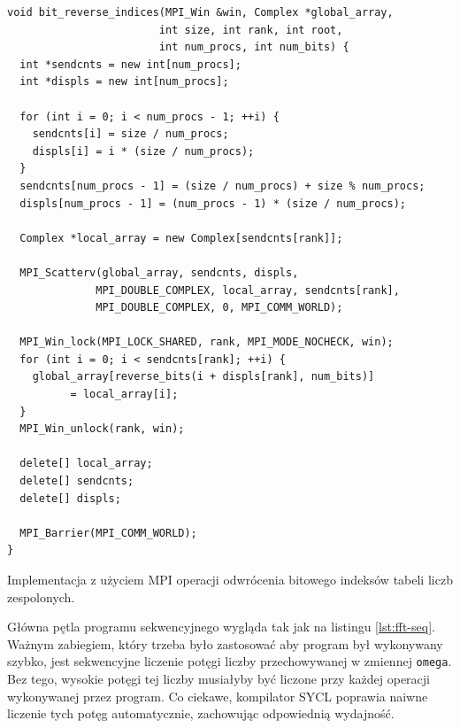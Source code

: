 \documentclass[a4paper,12pt]{book} %
\begin{document}
\begin{lstfloat}
\lstset{language=C++}
\begin{lstlisting}[frame=single]
void bit_reverse_indices(MPI_Win &win, Complex *global_array,
 						int size, int rank, int root,
 						int num_procs, int num_bits) {
  int *sendcnts = new int[num_procs];
  int *displs = new int[num_procs];

  for (int i = 0; i < num_procs - 1; ++i) {
    sendcnts[i] = size / num_procs;
    displs[i] = i * (size / num_procs);
  }
  sendcnts[num_procs - 1] = (size / num_procs) + size % num_procs;
  displs[num_procs - 1] = (num_procs - 1) * (size / num_procs);

  Complex *local_array = new Complex[sendcnts[rank]];

  MPI_Scatterv(global_array, sendcnts, displs,
  			  MPI_DOUBLE_COMPLEX, local_array, sendcnts[rank],
  			  MPI_DOUBLE_COMPLEX, 0, MPI_COMM_WORLD);

  MPI_Win_lock(MPI_LOCK_SHARED, rank, MPI_MODE_NOCHECK, win);
  for (int i = 0; i < sendcnts[rank]; ++i) {
    global_array[reverse_bits(i + displs[rank], num_bits)] 
    	  = local_array[i];
  }
  MPI_Win_unlock(rank, win);

  delete[] local_array;
  delete[] sendcnts;
  delete[] displs;

  MPI_Barrier(MPI_COMM_WORLD);
}
\end{lstlisting}
\caption{Implementacja z użyciem MPI operacji odwrócenia bitowego indeksów tabeli liczb zespolonych.}
\label{lst:bit-reverse-mpi}
\end{lstfloat}

Główna pętla programu sekwencyjnego wygląda tak jak na listingu \ref{lst:fft-seq}. Ważnym zabiegiem, który trzeba było zastosować aby program był wykonywany szybko, jest sekwencyjne liczenie potęgi liczby przechowywanej w zmiennej \texttt{omega}. Bez tego, wysokie potęgi tej liczby musiałyby być liczone przy każdej operacji wykonywanej przez program. Co ciekawe, kompilator SYCL poprawia naiwne liczenie tych potęg automatycznie, zachowując odpowiednią wydajność.
\end{document}
